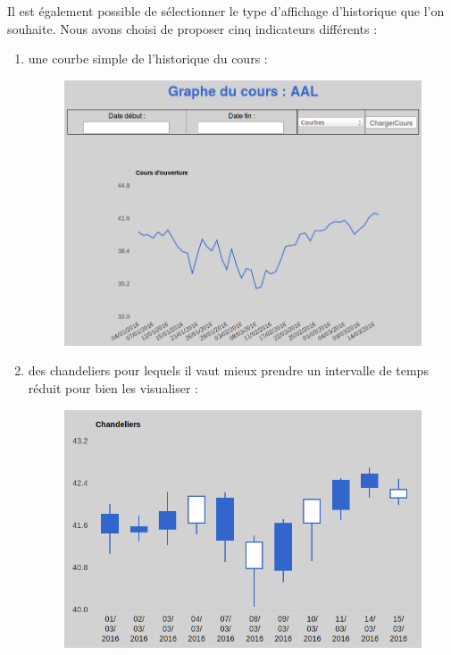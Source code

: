 \begin{enumerate}
      Il est également possible de sélectionner le type d'affichage d'historique que l'on souhaite. Nous avons choisi de proposer cinq indicateurs différents : 
      \begin{enumerate}
	\item une courbe simple de l'historique du cours :\\
	  \begin{figure}[H]
	    \center
	    \includegraphics[scale=0.5]{../graph/6-historiquecourbe.png}
	  \end{figure}
	\item des chandeliers pour lequels il vaut mieux prendre un intervalle de temps réduit pour bien les visualiser :\\  
	  \begin{figure}[H]
	    \center
	    \includegraphics[scale=0.5]{../graph/6-historiquechandeliers.png}

\end{figure}
\end{enumerate}
\end{enumerate}
